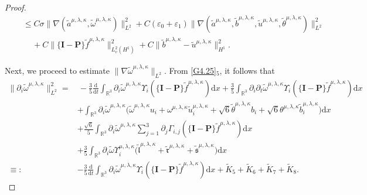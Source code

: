 \documentclass[reqno,11pt]{amsart}
\theoremstyle{plain}
\numberwithin{equation}{section}
\newcommand{\eps}{{\varepsilon}}
\begin{document}
\begin{proof}
\begin{align}
 &\quad \leq  C\sigma \|\nabla (\widetilde{a}^{\mu,\lambda,\kappa}, \widetilde\omega^{\mu,\lambda,\kappa})\|_{L^2}^2+C(\eps_0+\eps_1)\|\nabla(\widetilde{a}^{\mu,\lambda,\kappa},\widetilde{b}^{\mu,\lambda,\kappa},\widetilde{u}^{\mu,\lambda,\kappa},\widetilde{\theta}^{\mu,\lambda,\kappa})\|_{L^2}^2\nonumber\\
&\qquad\, +C \|\{\mathbf{I}-\mathbf{P}\} \widetilde{f}^{\mu,\lambda,\kappa}\|_{L_v^2 (H^1 )}^2+C\|\widetilde{b}^{\mu,\lambda,\kappa}-\widetilde{u}^{\mu,\lambda,\kappa}\|_{H^1}^2.  
\end{align}

Next, we proceed to estimate $\|\nabla\widetilde{\omega}^{\mu,\lambda,\kappa}\|_{L^2}$.
From \eqref{G4.25}$_5$, it follows that  
\begin{align}\label{G4.30}
 \|  \partial_i \widetilde\omega^{\mu,\lambda,\kappa} \|_{L^2}^2= &\, -\frac{3}{5} \frac{\mathrm{d}}{\mathrm{d} t} \int_{\mathbb{R}^3}  \partial_i \widetilde\omega^{\mu,\lambda,\kappa}   \Upsilon_i(\{\mathbf{I}-\mathbf{P}\} \widetilde{f}^{\mu,\lambda,\kappa}) \mathrm{d} x+\frac{3}{5} \int_{\mathbb{R}^3}   \partial_i \partial_t \widetilde\omega^{\mu,\lambda,\kappa}   \Upsilon_i(\{\mathbf{I}-\mathbf{P}\} \widetilde{f}^{\mu,\lambda,\kappa}) \mathrm{d} x \nonumber\\
& +\int_{\mathbb{R}^3}  \partial_i \widetilde\omega^{\mu,\lambda,\kappa}   \big(\widetilde\omega^{\mu,\lambda,\kappa} u_i+\omega^{\mu,\lambda,\kappa}\widetilde{u}^{\mu,\lambda,\kappa}_i+\sqrt{6} \widetilde{\theta}^{\mu,\lambda,\kappa} b_i+\sqrt{6}\theta^{\mu,\lambda,\kappa}\widetilde{b}^{\mu,\lambda,\kappa}_i \big) \mathrm{d} x\nonumber\\
& +\frac{\sqrt{6}}{5} \int_{\mathbb{R}^3}   \partial_i \widetilde\omega^{\mu,\lambda,\kappa}   \sum_{j=1}^3 \partial_j \Gamma_{i, j}(\{\mathbf{I}-\mathbf{P}\} \widetilde{f}^{\mu,\lambda,\kappa})  \mathrm{d} x\nonumber\\
&+ \frac{3}{5}\int_{\mathbb{R}^3}   \partial_i \widetilde\omega \Upsilon_i^{\mu,\lambda,\kappa}\big(\widetilde{\mathfrak{l}}^{\mu,\lambda,\kappa}+\widetilde{\mathfrak{r}}^{\mu,\lambda,\kappa}+\widetilde{\mathfrak{s}}^{\mu,\lambda,\kappa}\big) \mathrm{d} x \nonumber\\
\equiv: & -\frac{3}{5} \frac{\mathrm{d}}{\mathrm{d} t} \int_{\mathbb{R}^3}  \partial_i \widetilde\omega^{\mu,\lambda,\kappa}   \Upsilon_i(\{\mathbf{I}-\mathbf{P}\} \widetilde{f}^{\mu,\lambda,\kappa}) \mathrm{d} x+ \widetilde{K}_5+\widetilde{K}_6+\widetilde{K}_7+\widetilde{K}_8.
\end{align}

\end{proof}
\end{document}
